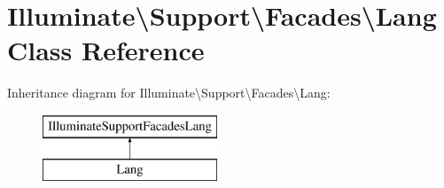 \hypertarget{class_illuminate_1_1_support_1_1_facades_1_1_lang}{}\section{Illuminate\textbackslash{}Support\textbackslash{}Facades\textbackslash{}Lang Class Reference}
\label{class_illuminate_1_1_support_1_1_facades_1_1_lang}
Inheritance diagram for Illuminate\textbackslash{}Support\textbackslash{}Facades\textbackslash{}Lang\+:\begin{figure}[H]
\begin{center}
\leavevmode
\includegraphics[height=2.000000cm]{class_illuminate_1_1_support_1_1_facades_1_1_lang}
\end{center}
\end{figure}
